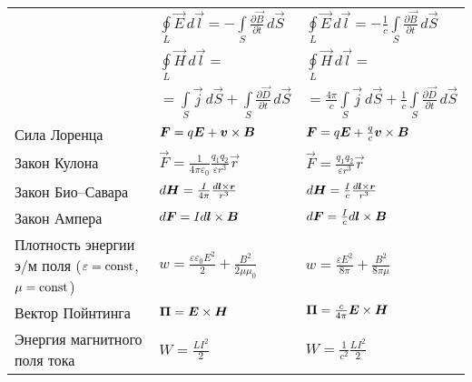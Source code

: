\begin{longtable}{p{40mm}p{30mm}p{30mm}}
    & $\oint\limits_{L}\vec{E}\,d\vec{l}=-\int\limits_{S}\frac{\partial\vec{B}}{\partial t}\,d\vec{S}$
    & $\oint\limits_{L}\vec{E}\,d\vec{l}=-\frac{1}{c}\int\limits_{S}\frac{\partial\vec{B}}{\partial t}\,d\vec{S}$\\
    & $\oint\limits_{L}\vec{H}\,d\vec{l}=$ 
    & $\oint\limits_{L}\vec{H}\,d\vec{l}=$\\
    & $=\int\limits_{S}\vec{j}\,d\vec{S}+\int\limits_{S}\frac{\partial\vec{D}}{\partial t}\,d\vec{S}$
    & $=\frac{4\pi}{c}\int\limits_{S}\vec{j}\,d\vec{S}+\frac{1}{c}\int\limits_{S}\frac{\partial\vec{D}}{\partial t}\,d\vec{S}$
    \bigstrut[b] \\ \hline
\bigstrut
Сила Лоренца
                & ${\boldsymbol{F}}=q{\boldsymbol{E}}+{\boldsymbol{v}} \times {\boldsymbol{B}}$ 
                & ${\boldsymbol{F}}=q{\boldsymbol{E}}+\frac{q}{c}{\boldsymbol{v}} \times {\boldsymbol{B}}$ \\ \hline
\bigstrut                
Закон Кулона    
                & $\vec{F}=\frac{1}{4\pi\varepsilon_0}\frac{q_1q_2}{\varepsilon r^3}\vec{r}$ 
                & $\vec{F}=\frac{q_1q_2}{\varepsilon r^3}\vec{r}$ \\ \hline
Закон Био--Савара 
                & $d{\boldsymbol{H}}=\frac{I}{4\pi}\frac{d{\boldsymbol{l}} \times {\boldsymbol{r}}}{r^3}$
                & $d{\boldsymbol{H}}=\frac{I}{c}\frac{d{\boldsymbol{l}} \times {\boldsymbol{r}}}{r^3}$ \bigstrut \\ \hline
Закон Ампера 
                & $d{\boldsymbol{F}}=Id{\boldsymbol{l}} \times {\boldsymbol{B}}$
                & $d{\boldsymbol{F}}=\frac{I}{c}d{\boldsymbol{l}} \times {\boldsymbol{B}}$ \bigstrut\\ \hline
\parbox{40mm}{Плотность энергии э/м\\[-2.5pt] поля
    ($\varepsilon=\mathrm{const}$, $\mu=\mathrm{const}$)}
& $w=\frac{\varepsilon\varepsilon_0E^2}{2}
    +\frac{B^2}{2\mu\mu_0}$
& $w=\frac{\varepsilon E^2}{8\pi} + \frac{B^2}{8\pi \mu}$
                \bigstrut \\ \hline
Вектор Пойнтинга 
                & ${\boldsymbol{\Pi}}={\boldsymbol{E}} \times {\boldsymbol{H}}$
                & ${\boldsymbol{\Pi}}=\frac{c}{4\pi}{\boldsymbol{E}} \times {\boldsymbol{H}}$ \bigstrut\\ \hline
\parbox{40mm}{Энергия магнитного\\[-2.5pt] поля тока}       
                & $W=\frac{LI^2}{2}$
                & $W=\frac{1}{c^2}\frac{LI^2}{2}$ \bigstrut\\ \hline

\end{longtable}
